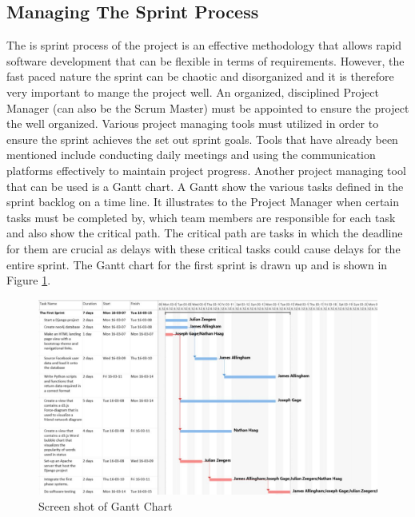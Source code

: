 \documentclass[12pt,onecolumn]{article}
\begin{document}
	\subsection{Managing The Sprint Process}
	The is sprint process of the project is an effective methodology that allows rapid software development that can be flexible in terms of requirements. However, the fast paced nature the sprint can be chaotic and disorganized and it is therefore very important to mange the project well. An organized, disciplined Project Manager (can also be the Scrum Master) must be appointed to ensure the project the well organized. Various project managing tools must utilized in order to ensure the sprint achieves the set out sprint goals. Tools that have already been mentioned include conducting daily meetings and using the communication platforms effectively to maintain project progress. Another project managing tool that can be used is a Gantt chart. A Gantt show the various tasks defined in the sprint backlog on a time line. It illustrates to the Project Manager when certain tasks must be completed by, which team members are responsible for each task and also show the critical path. The critical path are tasks in which the deadline for them are crucial as delays with these critical tasks could cause delays for the entire sprint. The Gantt chart for the first sprint is drawn up and is shown in Figure \ref{gantt}.
	
	\begin{figure}[h!]
		\centering
		\includegraphics[width=\textwidth]{gantt}
		\caption{Screen shot of Gantt Chart}
		\label{gantt}
	\end{figure}
	
	
	
	
	
\end{document}
